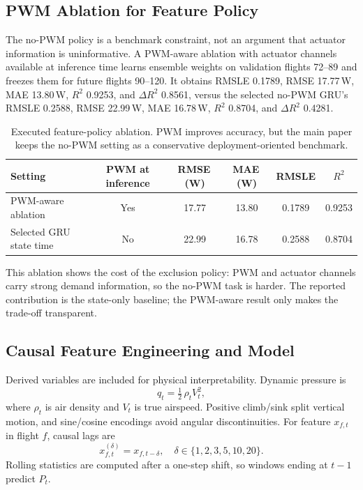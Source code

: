 \documentclass[runningheads,a4paper]{llncs}
\begin{document}
\subsection{PWM Ablation for Feature Policy}

The no-PWM policy is a benchmark constraint, not an argument that actuator information is uninformative. A PWM-aware ablation with actuator channels available at inference time learns ensemble weights on validation flights 72--89 and freezes them for future flights 90--120. It obtains RMSLE 0.1789, RMSE 17.77\,W, MAE 13.80\,W, $R^2$ 0.9253, and $\Delta R^2$ 0.8561, versus the selected no-PWM GRU's RMSLE 0.2588, RMSE 22.99\,W, MAE 16.78\,W, $R^2$ 0.8704, and $\Delta R^2$ 0.4281.

\begin{table}[!htbp]
\caption{Executed feature-policy ablation. PWM improves accuracy, but the main paper keeps the no-PWM setting as a conservative deployment-oriented benchmark.}
\label{tab:pwmablation}
\centering
{\small
\begin{tabular}{lccccc}
\toprule
Setting & PWM at inference & RMSE\,(W) & MAE\,(W) & RMSLE & $R^2$ \\
\midrule
PWM-aware ablation & Yes & 17.77 & 13.80 & 0.1789 & 0.9253 \\
Selected GRU state time & No & 22.99 & 16.78 & 0.2588 & 0.8704 \\
\bottomrule
\end{tabular}
}
\end{table}

This ablation shows the cost of the exclusion policy: PWM and actuator channels carry strong demand information, so the no-PWM task is harder. The reported contribution is the state-only baseline; the PWM-aware result only makes the trade-off transparent.

\subsection{Causal Feature Engineering and Model}

Derived variables are included for physical interpretability. Dynamic pressure is
\begin{equation}
  q_t = \tfrac{1}{2}\,\rho_t V_t^2, \label{eq:q}
\end{equation}
where $\rho_t$ is air density and $V_t$ is true airspeed. Positive climb/sink split vertical motion, and sine/cosine encodings avoid angular discontinuities. For feature $x_{f,t}$ in flight $f$, causal lags are
\begin{equation}
  x^{(\delta)}_{f,t} = x_{f,t-\delta}, \quad \delta \in \{1,2,3,5,10,20\}. \label{eq:lag}
\end{equation}
Rolling statistics are computed after a one-step shift, so windows ending at $t-1$ predict $P_t$.
\end{document}
